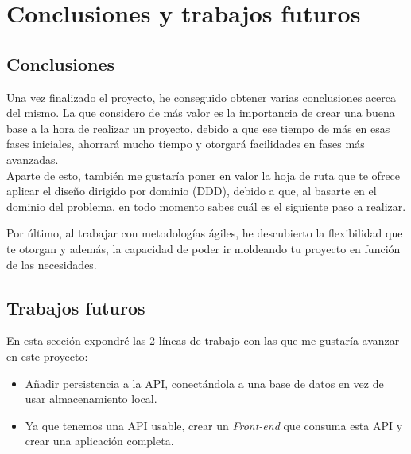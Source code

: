 \chapter{Conclusiones y trabajos futuros}

\section{Conclusiones}
Una vez finalizado el proyecto, he conseguido obtener varias conclusiones acerca del mismo.
La que considero de más valor es la importancia de crear una buena base a la hora de realizar un proyecto, debido a que ese tiempo de más 
en esas fases iniciales, ahorrará mucho tiempo y otorgará facilidades en fases más avanzadas.\\

Aparte de esto, también me gustaría poner en valor la hoja de ruta que te ofrece aplicar el diseño dirigido por dominio (DDD), debido a que,
al basarte en el dominio del problema, en todo momento sabes cuál es el siguiente paso a realizar.

Por último, al trabajar con metodologías ágiles, he descubierto la flexibilidad que te otorgan y además, la capacidad de poder ir moldeando tu
proyecto en función de las necesidades.

\section{Trabajos futuros}

En esta sección expondré las 2 líneas de trabajo con las que me gustaría avanzar en este proyecto:

\begin{itemize}
    \item Añadir persistencia a la API, conectándola a una base de datos en vez de usar almacenamiento local.
    \item Ya que tenemos una API usable, crear un \textit{Front-end} que consuma esta API y crear una aplicación completa.
\end{itemize} 